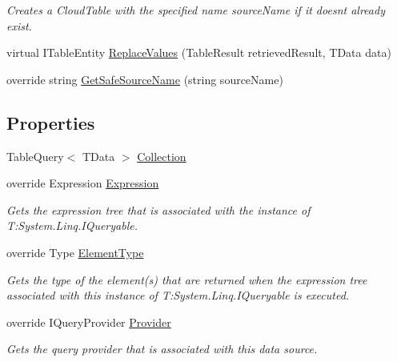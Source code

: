\begin{DoxyCompactItemize}
\begin{DoxyCompactList}\small\item\em Creates a Cloud\+Table with the specified name {\itshape source\+Name}  if it doesn\textquotesingle{}t already exist. \end{DoxyCompactList}\item 
virtual I\+Table\+Entity \hyperlink{classCqrs_1_1Azure_1_1BlobStorage_1_1TableStorageStore_adc625eceee6e2b190997a771740e01b9_adc625eceee6e2b190997a771740e01b9}{Replace\+Values} (Table\+Result retrieved\+Result, T\+Data data)
\item 
override string \hyperlink{classCqrs_1_1Azure_1_1BlobStorage_1_1TableStorageStore_a7b9e49aa8017ff3c55b184b956a150d0_a7b9e49aa8017ff3c55b184b956a150d0}{Get\+Safe\+Source\+Name} (string source\+Name)
\end{DoxyCompactItemize}
\subsection*{Properties}
\begin{DoxyCompactItemize}
\item 
Table\+Query$<$ T\+Data $>$ \hyperlink{classCqrs_1_1Azure_1_1BlobStorage_1_1TableStorageStore_a97752ec9c5ad130a230924da9a75a537_a97752ec9c5ad130a230924da9a75a537}{Collection}
\item 
override Expression \hyperlink{classCqrs_1_1Azure_1_1BlobStorage_1_1TableStorageStore_af7d55541709a0519bdb0b5d201c5a97c_af7d55541709a0519bdb0b5d201c5a97c}{Expression}
\begin{DoxyCompactList}\small\item\em Gets the expression tree that is associated with the instance of T\+:\+System.\+Linq.\+I\+Queryable. \end{DoxyCompactList}\item 
override Type \hyperlink{classCqrs_1_1Azure_1_1BlobStorage_1_1TableStorageStore_a57e68c383098e81303eeebe0b85c970c_a57e68c383098e81303eeebe0b85c970c}{Element\+Type}
\begin{DoxyCompactList}\small\item\em Gets the type of the element(s) that are returned when the expression tree associated with this instance of T\+:\+System.\+Linq.\+I\+Queryable is executed. \end{DoxyCompactList}\item 
override I\+Query\+Provider \hyperlink{classCqrs_1_1Azure_1_1BlobStorage_1_1TableStorageStore_a95c1b0fce651992dd6bd75f44da15829_a95c1b0fce651992dd6bd75f44da15829}{Provider}
\begin{DoxyCompactList}\small\item\em Gets the query provider that is associated with this data source. \end{DoxyCompactList}\end{DoxyCompactItemize}


